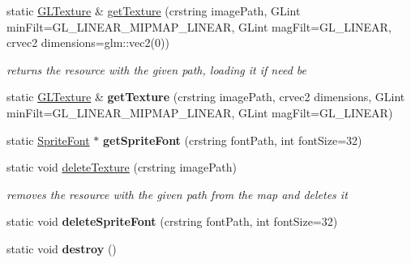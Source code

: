 \begin{DoxyCompactItemize}
\item 
\mbox{\label{classnta_1_1ResourceManager_a9058dbd86949123968e61de1fb6234f2}} 
static \hyperlink{namespacenta_d3/dff/structnta_1_1GLTexture}{G\+L\+Texture} \& \hyperlink{classnta_1_1ResourceManager_a9058dbd86949123968e61de1fb6234f2}{get\+Texture} (crstring image\+Path, G\+Lint min\+Filt=G\+L\+\_\+\+L\+I\+N\+E\+A\+R\+\_\+\+M\+I\+P\+M\+A\+P\+\_\+\+L\+I\+N\+E\+AR, G\+Lint mag\+Filt=G\+L\+\_\+\+L\+I\+N\+E\+AR, crvec2 dimensions=glm\+::vec2(0))
\begin{DoxyCompactList}\small\item\em returns the resource with the given path, loading it if need be \end{DoxyCompactList}\item 
\mbox{\label{classnta_1_1ResourceManager_a0288c8895b2182c4ea38ecdac5bfa1e1}} 
static \hyperlink{namespacenta_d3/dff/structnta_1_1GLTexture}{G\+L\+Texture} \& {\bfseries get\+Texture} (crstring image\+Path, crvec2 dimensions, G\+Lint min\+Filt=G\+L\+\_\+\+L\+I\+N\+E\+A\+R\+\_\+\+M\+I\+P\+M\+A\+P\+\_\+\+L\+I\+N\+E\+AR, G\+Lint mag\+Filt=G\+L\+\_\+\+L\+I\+N\+E\+AR)
\item 
\mbox{\label{classnta_1_1ResourceManager_a0411e5cf357d6d285820338d92d06a0e}} 
static \hyperlink{classnta_1_1SpriteFont}{Sprite\+Font} $\ast$ {\bfseries get\+Sprite\+Font} (crstring font\+Path, int font\+Size=32)
\item 
\mbox{\label{classnta_1_1ResourceManager_a2f9971f86fc9e50d7a62aa5f6f91a489}} 
static void \hyperlink{classnta_1_1ResourceManager_a2f9971f86fc9e50d7a62aa5f6f91a489}{delete\+Texture} (crstring image\+Path)
\begin{DoxyCompactList}\small\item\em removes the resource with the given path from the map and deletes it \end{DoxyCompactList}\item 
\mbox{\label{classnta_1_1ResourceManager_a16c549cb1496d1f38b5900258b0624c7}} 
static void {\bfseries delete\+Sprite\+Font} (crstring font\+Path, int font\+Size=32)
\item 
\mbox{\label{classnta_1_1ResourceManager_a26ff6f1cb4044d8f47fa5db9a3df2514}} 
static void {\bfseries destroy} ()
\end{DoxyCompactItemize}
